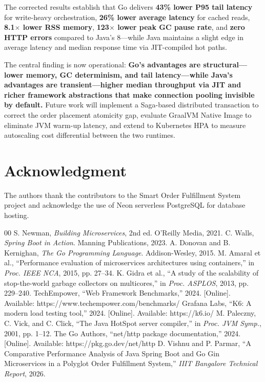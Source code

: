 \documentclass[conference]{IEEEtran}
\begin{document}
The corrected results establish that Go delivers \textbf{43\% lower P95 tail latency} for write-heavy orchestration, \textbf{26\% lower average latency} for cached reads, \textbf{8.1$\times$ lower RSS memory}, \textbf{123$\times$ lower peak GC pause rate}, and \textbf{zero HTTP errors} compared to Java's 8---while Java maintains a slight edge in average latency and median response time via JIT-compiled hot paths.

The central finding is now operational: \textbf{Go's advantages are structural---lower memory, GC determinism, and tail latency---while Java's advantages are transient---higher median throughput via JIT and richer framework abstractions that make connection pooling invisible by default.} Future work will implement a Saga-based distributed transaction to correct the order placement atomicity gap, evaluate GraalVM Native Image to eliminate JVM warm-up latency, and extend to Kubernetes HPA to measure autoscaling cost differential between the two runtimes.

\section*{Acknowledgment}

The authors thank the contributors to the Smart Order Fulfillment System project and acknowledge the use of Neon serverless PostgreSQL for database hosting.

\begin{thebibliography}{00}
 S. Newman, \textit{Building Microservices}, 2nd ed. O'Reilly Media, 2021.
 C. Walls, \textit{Spring Boot in Action}. Manning Publications, 2023.
 A. Donovan and B. Kernighan, \textit{The Go Programming Language}. Addison-Wesley, 2015.
 M. Amaral et al., ``Performance evaluation of microservices architectures using containers,'' in \textit{Proc. IEEE NCA}, 2015, pp. 27--34.
 K. Gidra et al., ``A study of the scalability of stop-the-world garbage collectors on multicores,'' in \textit{Proc. ASPLOS}, 2013, pp. 229--240.
 TechEmpower, ``Web Framework Benchmarks,'' 2024. [Online]. Available: https://www.techempower.com/benchmarks/
 Grafana Labs, ``K6: A modern load testing tool,'' 2024. [Online]. Available: https://k6.io/
 M. Paleczny, C. Vick, and C. Click, ``The Java HotSpot server compiler,'' in \textit{Proc. JVM Symp.}, 2001, pp. 1--12.
 The Go Authors, ``net/http package documentation,'' 2024. [Online]. Available: https://pkg.go.dev/net/http
 D. Vishnu and P. Parmar, ``A Comparative Performance Analysis of Java Spring Boot and Go Gin Microservices in a Polyglot Order Fulfillment System,'' \textit{IIIT Bangalore Technical Report}, 2026.
\end{thebibliography}
\end{document}

